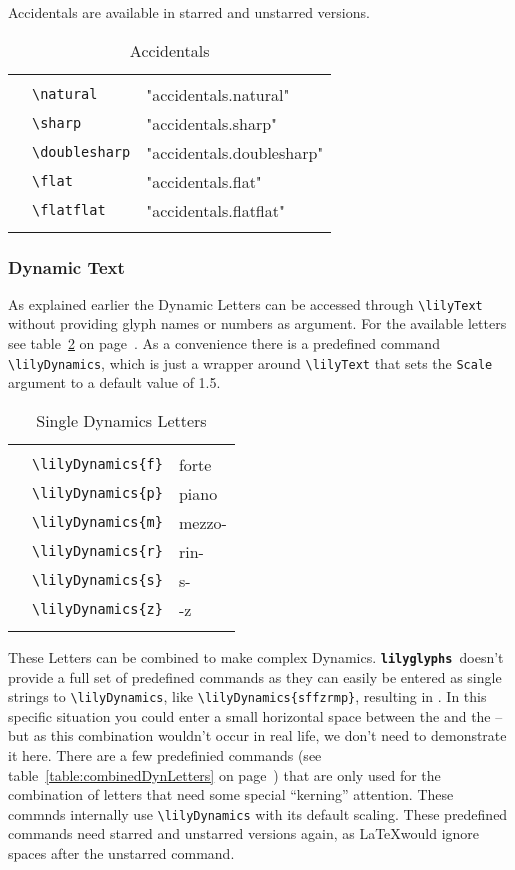 \documentclass{article}
\newcommand*{\lilyglyphs}{\texttt{\textbf{lilyglyphs\,}}}
\newcommand*{\cmd}[1]{\texttt{\textbackslash #1}}
\newcommand{\tmpCaption}{} %
\newcommand{\tmpLabel}{}
\newenvironment{reftable}[2]
	{%
		\renewcommand{\tmpCaption}{#1}
		\renewcommand{\tmpLabel}{#2}
		\begin{table}[ht]
		\begin{center}
		\begin{tabular}[t]{lll}
		\hline
		&\\
	}
	{%
		&\\
		\hline
		\end{tabular}
		\caption{\tmpCaption}
		\label{table:\tmpLabel}
		\end{center}
		\end{table}
	}
\begin{document}
Accidentals are available in starred and unstarred versions.

\begin{reftable}{Accidentals}{accidentals}
\natural & \cmd{natural} & "accidentals.natural"\\
\sharp & \cmd{sharp} & "accidentals.sharp"\\
\doublesharp & \cmd{doublesharp} & "accidentals.doublesharp"\\
\flat & \cmd{flat} & "accidentals.flat"\\
\flatflat & \cmd{flatflat} & "accidentals.flatflat"\\
\end{reftable}



\subsubsection{Dynamic Text}
\label{subsubsec:dynamic_text}
As explained earlier the Dynamic Letters can be accessed through \cmd{lilyText} without providing glyph names or numbers as argument. 
For the available letters see table~\ref{table:singleDynLetters} on page~\pageref{table:singleDynLetters}. 
As a convenience there is a predefined command \cmd{lilyDynamics}, which is just a wrapper around \cmd{lilyText} that sets the \texttt{Scale} argument to a default value of 1.5.

\begin{reftable}{Single Dynamics Letters}{singleDynLetters}
\lilyDynamics{f} & \cmd{lilyDynamics\{f\}} & forte\\
\lilyDynamics{p} & \cmd{lilyDynamics\{p\}} & piano\\
\lilyDynamics{m} & \cmd{lilyDynamics\{m\}} & mezzo-\\
\lilyDynamics{r} & \cmd{lilyDynamics\{r\}} & rin-\\
\lilyDynamics{s} & \cmd{lilyDynamics\{s\}} & s-\\
\lilyDynamics{z} & \cmd{lilyDynamics\{z\}} & -z\\
\end{reftable}

These Letters can be combined to make complex Dynamics. 
\lilyglyphs doesn't provide a full set of predefined commands as they can easily be entered as single strings to \cmd{lilyDynamics}, like \cmd{lilyDynamics\{sffzrmp\}}, resulting in . 
In this specific situation you could enter a small horizontal space between the  and the  -- but as this combination wouldn't occur in real life, we don't need to demonstrate it here.
There are a few predefinied commands (see table~\ref{table:combinedDynLetters} on page~\pageref{table:combinedDynLetters}) that are only used for the combination of letters that need some special \enquote{kerning} attention. These commnds internally use \cmd{lilyDynamics} with its default scaling. These predefined commands need starred and unstarred versions again, as \LaTeX would ignore spaces after the unstarred command.
\end{document}
